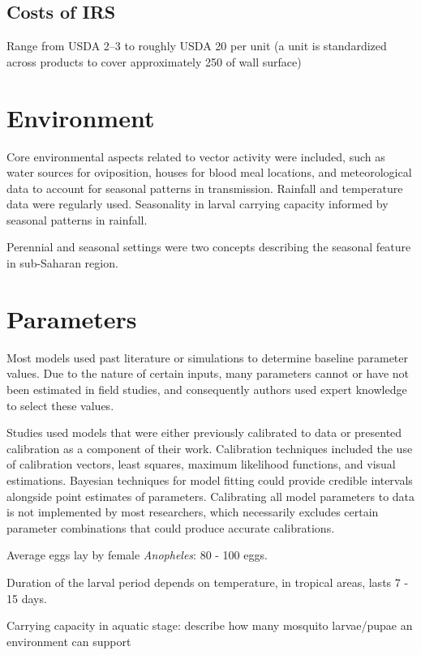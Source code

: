 \documentclass[a4paper, 12pt, twoside]{article}
\begin{document}
\subsection{Costs of IRS}
Range from USDA 2–3 to roughly USDA 20 per unit\cite{Oxborough2016}
(a unit is standardized across products to cover approximately 250 of wall surface)

\section{Environment}%
\label{sec:environment}
Core environmental aspects related to vector activity were included, such as water sources for oviposition, houses for blood meal locations, and meteorological data to account for seasonal patterns in transmission.
Rainfall and temperature data were regularly used.
Seasonality in larval carrying capacity informed by seasonal patterns in rainfall\cite{Walker2016}.

Perennial and seasonal settings were two concepts describing the seasonal feature in sub-Saharan region.

\section{Parameters}

Most models used past literature or simulations to determine baseline parameter values.
Due to the nature of certain inputs, many parameters cannot or have not been estimated in field studies, and consequently authors used expert knowledge to select these values.

Studies used models that were either previously calibrated to data or presented calibration as a component of their work.
Calibration techniques included the use of calibration vectors, least squares, maximum likelihood functions, and visual estimations.
Bayesian techniques for model fitting could provide credible intervals alongside point estimates of parameters.
Calibrating all model parameters to data is not implemented by most researchers, which necessarily excludes certain parameter combinations that could produce accurate calibrations.

Average eggs lay by female \textit{Anopheles}: 80 - 100 eggs.

Duration of the larval period depends on temperature, in tropical areas, lasts 7 - 15 days.\cite{bayoh_lindsay_2003}

Carrying capacity in aquatic stage: describe how many mosquito larvae/pupae an environment can support
\end{document}
